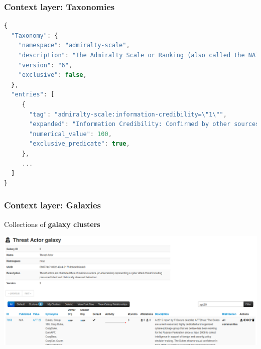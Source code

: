 \begin{frame}[fragile]
    \frametitle{Context layer: Taxonomies}
    \begin{lstlisting}[language=javascript,firstnumber=1]
{
  "Taxonomy": {
    "namespace": "admiralty-scale",
    "description": "The Admiralty Scale or Ranking (also called the NATO System)...",
    "version": "6",
    "exclusive": false,
  },
  "entries": [
     {
       "tag": "admiralty-scale:information-credibility=\"1\"",
       "expanded": "Information Credibility: Confirmed by other sources",
       "numerical_value": 100,
       "exclusive_predicate": true,
     },
     ...
  ]
}
\end{lstlisting}
\end{frame}

\begin{frame}
    \frametitle{Context layer: Galaxies}
    Collections of {\bf galaxy clusters}
    \begin{center}
        \includegraphics[width=1.0\linewidth]{screenshots/galaxy.png}
    \end{center}
\end{frame}

